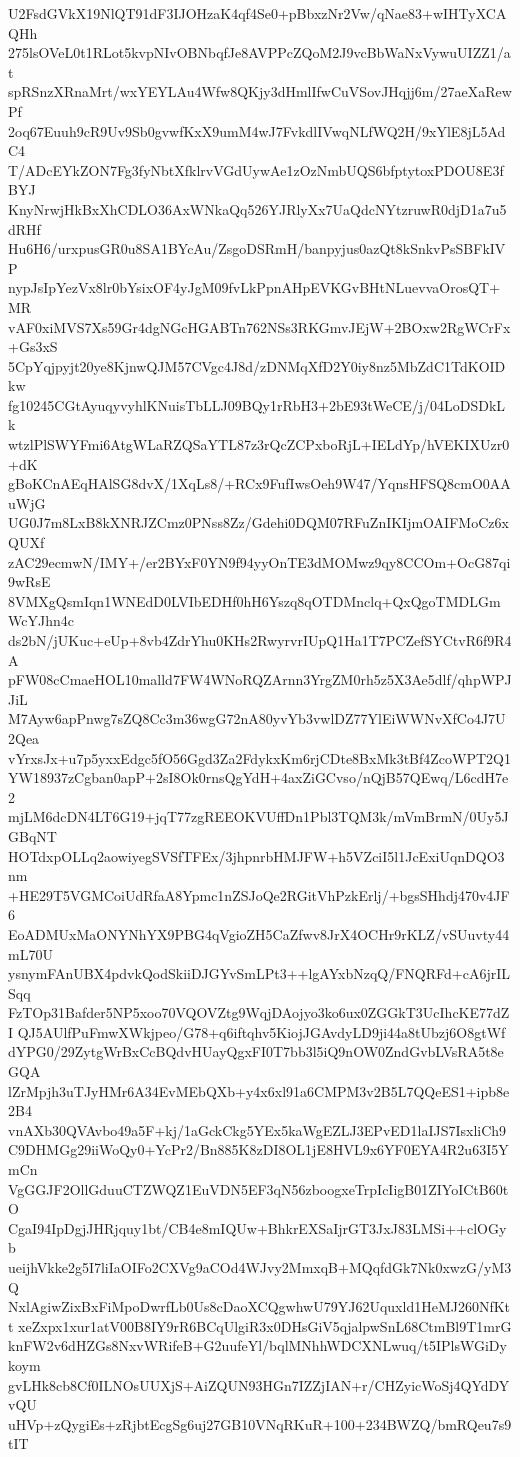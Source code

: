 U2FsdGVkX19NlQT91dF3IJOHzaK4qf4Se0+pBbxzNr2Vw/qNae83+wIHTyXCAQHh
275lsOVeL0t1RLot5kvpNIvOBNbqfJe8AVPPcZQoM2J9vcBbWaNxVywuUIZZ1/at
spRSnzXRnaMrt/wxYEYLAu4Wfw8QKjy3dHmlIfwCuVSovJHqjj6m/27aeXaRewPf
2oq67Euuh9cR9Uv9Sb0gvwfKxX9umM4wJ7FvkdlIVwqNLfWQ2H/9xYlE8jL5AdC4
T/ADcEYkZON7Fg3fyNbtXfklrvVGdUywAe1zOzNmbUQS6bfptytoxPDOU8E3fBYJ
KnyNrwjHkBxXhCDLO36AxWNkaQq526YJRlyXx7UaQdcNYtzruwR0djD1a7u5dRHf
Hu6H6/urxpusGR0u8SA1BYcAu/ZsgoDSRmH/banpyjus0azQt8kSnkvPsSBFkIVP
nypJsIpYezVx8lr0bYsixOF4yJgM09fvLkPpnAHpEVKGvBHtNLuevvaOrosQT+MR
vAF0xiMVS7Xs59Gr4dgNGcHGABTn762NSs3RKGmvJEjW+2BOxw2RgWCrFx+Gs3xS
5CpYqjpyjt20ye8KjnwQJM57CVgc4J8d/zDNMqXfD2Y0iy8nz5MbZdC1TdKOIDkw
fg10245CGtAyuqyvyhlKNuisTbLLJ09BQy1rRbH3+2bE93tWeCE/j/04LoDSDkLk
wtzlPlSWYFmi6AtgWLaRZQSaYTL87z3rQcZCPxboRjL+IELdYp/hVEKIXUzr0+dK
gBoKCnAEqHAlSG8dvX/1XqLs8/+RCx9FufIwsOeh9W47/YqnsHFSQ8cmO0AAuWjG
UG0J7m8LxB8kXNRJZCmz0PNss8Zz/Gdehi0DQM07RFuZnIKIjmOAIFMoCz6xQUXf
zAC29ecmwN/IMY+/er2BYxF0YN9f94yyOnTE3dMOMwz9qy8CCOm+OcG87qi9wRsE
8VMXgQsmIqn1WNEdD0LVIbEDHf0hH6Yszq8qOTDMnclq+QxQgoTMDLGmWcYJhn4c
ds2bN/jUKuc+eUp+8vb4ZdrYhu0KHs2RwyrvrIUpQ1Ha1T7PCZefSYCtvR6f9R4A
pFW08cCmaeHOL10malld7FW4WNoRQZArnn3YrgZM0rh5z5X3Ae5dlf/qhpWPJJiL
M7Ayw6apPnwg7sZQ8Cc3m36wgG72nA80yvYb3vwlDZ77YlEiWWNvXfCo4J7U2Qea
vYrxsJx+u7p5yxxEdgc5fO56Ggd3Za2FdykxKm6rjCDte8BxMk3tBf4ZcoWPT2Q1
YW18937zCgban0apP+2sI8Ok0rnsQgYdH+4axZiGCvso/nQjB57QEwq/L6cdH7e2
mjLM6dcDN4LT6G19+jqT77zgREEOKVUffDn1Pbl3TQM3k/mVmBrmN/0Uy5JGBqNT
HOTdxpOLLq2aowiyegSVSfTFEx/3jhpnrbHMJFW+h5VZciI5l1JcExiUqnDQO3nm
+HE29T5VGMCoiUdRfaA8Ypmc1nZSJoQe2RGitVhPzkErlj/+bgsSHhdj470v4JF6
EoADMUxMaONYNhYX9PBG4qVgioZH5CaZfwv8JrX4OCHr9rKLZ/vSUuvty44mL70U
ysnymFAnUBX4pdvkQodSkiiDJGYvSmLPt3++lgAYxbNzqQ/FNQRFd+cA6jrILSqq
FzTOp31Bafder5NP5xoo70VQOVZtg9WqjDAojyo3ko6ux0ZGGkT3UcIhcKE77dZI
QJ5AUlfPuFmwXWkjpeo/G78+q6iftqhv5KiojJGAvdyLD9ji44a8tUbzj6O8gtWf
dYPG0/29ZytgWrBxCcBQdvHUayQgxFI0T7bb3l5iQ9nOW0ZndGvbLVsRA5t8eGQA
lZrMpjh3uTJyHMr6A34EvMEbQXb+y4x6xl91a6CMPM3v2B5L7QQeES1+ipb8e2B4
vnAXb30QVAvbo49a5F+kj/1aGckCkg5YEx5kaWgEZLJ3EPvED1laIJS7IsxliCh9
C9DHMGg29iiWoQy0+YcPr2/Bn885K8zDI8OL1jE8HVL9x6YF0EYA4R2u63I5YmCn
VgGGJF2OllGduuCTZWQZ1EuVDN5EF3qN56zboogxeTrpIcIigB01ZIYoICtB60tO
CgaI94IpDgjJHRjquy1bt/CB4e8mIQUw+BhkrEXSaIjrGT3JxJ83LMSi++clOGyb
ueijhVkke2g5I7liIaOIFo2CXVg9aCOd4WJvy2MmxqB+MQqfdGk7Nk0xwzG/yM3Q
NxlAgiwZixBxFiMpoDwrfLb0Us8cDaoXCQgwhwU79YJ62Uquxld1HeMJ260NfKtt
xeZxpx1xur1atV00B8IY9rR6BCqUlgiR3x0DHsGiV5qjalpwSnL68CtmBl9T1mrG
knFW2v6dHZGs8NxvWRifeB+G2uufeYl/bqlMNhhWDCXNLwuq/t5IPlsWGiDykoym
gvLHk8cb8Cf0ILNOsUUXjS+AiZQUN93HGn7IZZjIAN+r/CHZyicWoSj4QYdDYvQU
uHVp+zQygiEs+zRjbtEcgSg6uj27GB10VNqRKuR+100+234BWZQ/bmRQeu7s9tIT
